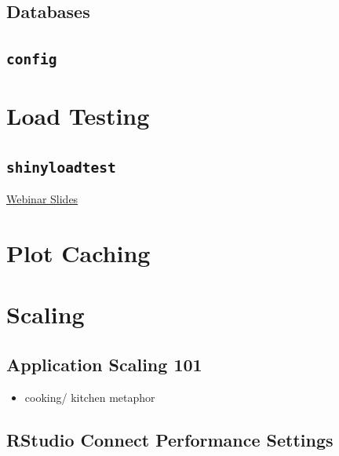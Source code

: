 \documentclass[]{book}
\providecommand{\tightlist}{%
  \setlength{\itemsep}{0pt}\setlength{\parskip}{0pt}}
\begin{document}
\hypertarget{databases}{%
\section{Databases}\label{databases}}

\hypertarget{config}{%
\section{\texorpdfstring{\texttt{config}}{config}}\label{config}}

\hypertarget{load-testing}{%
\chapter{Load Testing}\label{load-testing}}

\hypertarget{shinyloadtest}{%
\section{\texorpdfstring{\texttt{shinyloadtest}}{shinyloadtest}}\label{shinyloadtest}}

\href{https://github.com/rstudio/webinars/blob/master/63-shinyloadtest/slides.pdf}{Webinar
Slides}

\hypertarget{plot-caching}{%
\chapter{Plot Caching}\label{plot-caching}}

\hypertarget{scaling}{%
\chapter{Scaling}\label{scaling}}

\hypertarget{application-scaling-101}{%
\section{Application Scaling 101}\label{application-scaling-101}}

\begin{itemize}
\tightlist
\item
  cooking/ kitchen metaphor
\end{itemize}

\hypertarget{rstudio-connect-performance-settings}{%
\section{RStudio Connect Performance
Settings}\label{rstudio-connect-performance-settings}}
\end{document}
